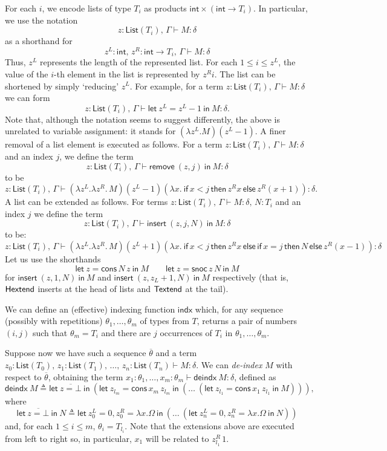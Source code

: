 \documentclass{CSML}
\theoremstyle{definition}\newtheorem{definition}[thm]{Definition}
\theoremstyle{definition}\newtheorem{example}[thm]{Example}
\theoremstyle{definition}\newtheorem{proposition}[thm]{Proposition}
\theoremstyle{definition}\newtheorem{lemma}[thm]{Lemma}
\theoremstyle{definition}\newtheorem{theorem}[thm]{Theorem}
\theoremstyle{definition}\newtheorem{corollary}[thm]{Corollary}
\theoremstyle{definition}\newtheorem{remark}[thm]{Remark}
\newcommand\nt[1]{#1}
\newcommand\defn{\triangleq}
\newcommand\arr{\rightarrow}
\renewcommand\int{\mathsf{int}}
\newcommand\List[1]{\mathsf{List}(#1)}
\newcommand\remove[3]{\mathsf{remove}\ (#1,#2)\ \mathsf{in}\ #3}
\newcommand\add[4]{\mathsf{insert}\ (#1,#2,#3)\ \mathsf{in}\ #4}
\newcommand\Hextend[3]{\mathsf{let}\ #1=\mathsf{cons}\, #2\, #1\ \mathsf{in}\ #3}
\newcommand\Textend[3]{\mathsf{let}\ #1=\mathsf{snoc}\, #1\, #2\ \mathsf{in}\ #3}
\newcommand\indx{\mathsf{indx}}
\newcommand\deindx[1]{\mathsf{deindx}\ #1}
\newcommand\letin[2]{\mathsf{let}\ #1\ \mathsf{in}\ #2}
\newcommand\cond[3]{\mathsf{if}\,#1\,\mathsf{then}\,#2\,\mathsf{else}\,#3}
\begin{document}
For each $i$, we encode lists of type $T_i$ as products $\int\times(\int\arr T_i)$. In particular, we use the notation
\[ z:\List{T_i},\,\Gamma \vdash M:\delta \]
as a shorthand for
\[ z^L:\int,\,z^R:\int\arr{T_i},\,\Gamma \vdash M:\delta \]
Thus, $z^L$ represents the length of the represented list. 
For each $1\leq i\leq z^L$, the value of the $i$-th element in the list is represented by $z^Ri$. The list can be shortened by simply `reducing' $z^L$. For example, for a term $z:\List{T_i},\,\Gamma \vdash M:\delta$ we can form
\[ z:\List{T_i},\,\Gamma \vdash \letin{z^L=z^L{-}1}{M}:\delta. \]
Note that, although the notation seems to suggest differently, the above is {unrelated} to variable assignment: it stands for
$(\lambda z^L.M)(z^L{-}1)$. 
A finer removal of a list element is executed as follows.
For a term $z:\List{T_i},\,\Gamma \vdash M:\delta$ and an index $j$, we define the term
\[  z:\List{T_i},\,\Gamma \vdash \remove{z}{j}{M}:\delta \]
to be
\[  
z:\List{T_i},\,\Gamma \vdash (\lambda z^L.\lambda z^R.\,M)(z^L{-}1)(\lambda x.\ \cond{x<j}{z^Rx}{z^R(x{+}1)}):\delta. 
\]
A list can be extended as follows.
For terms $z:\List{T_i},\,\Gamma \vdash M:\delta,\,N:T_i$ and an index $j$ we define the term
\[  
z:\List{T_i},\,\Gamma \vdash \add{z}{j}{N}{M}:\delta 
\]
to be:
\[  
z:\List{T_i},\,\Gamma \vdash (\lambda z^L.\lambda z^R.\,M)(z^L{+}1)(\lambda x.\ 
\cond{x<j}{z^Rx}{\cond{x=j}{N}{z^R(x{-}1)}}):\delta 
\]
Let us use the shorthands \nt{
\[
\Hextend{z}{N}{M}\qquad
\Textend{z}{N}{M}
\]}for $\add{z}{1}{N}{M}$ 
and $\add{z}{z_L{+}1}{N}{M}$ respectively
(that is, $\sf Hextend$ inserts at the head of lists and $\sf Textend$ at the tail).

We can define an (effective) indexing function $\indx$ which, for any sequence (possibly with repetitions) $\theta_1,\dots,\theta_m$ of types from $T$, returns a pair of numbers $(i,j)$ such that
$\theta_m=T_i$ and there are $j$ occurrences of $T_i$ in $\theta_1,\dots,\theta_m$.

Suppose now we have such a sequence $\overline \theta$ and a term $z_0:\List{T_0},\,z_1:\List{T_1},\,\dots,\, z_n:\List{T_n} \vdash M:\delta$. We can \emph{de-index} $M$ with respect to $\overline \theta$, obtaining the term $x_1:\theta_1,\dots,x_m:\theta_m \vdash \deindx{M}:\delta$, defined as
\[ \deindx{M} \defn \letin{\overline{z=\bot}}{(\Hextend{z_{l_m}}{x_m}{(\dots\ (\Hextend{z_{l_1}}{x_1}{M}))})}, \]
where 
\[ \letin{\overline{z=\bot}}{N}\defn \letin{z_{0}^L=0,z_{0}^R=\lambda x.\Omega}{(\dots\ (\letin{z_{n}^L=0,z_{n}^R=\lambda x.\Omega}{N}))} \]
and, for each $1\leq i\leq m$, $\theta_i=T_{l_i}$.
Note that the extensions above are executed from left to right so, in particular, $x_1$ will be related to $z_{l_1}^R\,1$.
\end{document}

